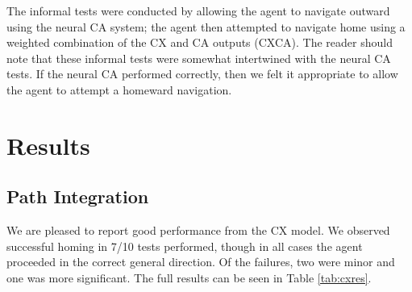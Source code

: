\documentclass[a4paper,11pt,twoside,openright]{article}
\let\oldsection\section
\def\section{\cleardoublepage\oldsection}
\begin{document}
The informal tests were conducted by allowing the agent to navigate
outward using the neural CA system; the agent then attempted to
navigate home using a weighted combination of the CX and CA outputs
(CXCA). The reader should note that these informal tests were somewhat
intertwined with the neural CA tests. If the neural CA performed
correctly, then we felt it appropriate to allow the agent to attempt a
homeward navigation.
\newpage

\section{ Results } \label{sec:results}
\subsection{ Path Integration }
We are pleased to report good performance from the CX model. We
observed successful homing in 7/10 tests performed, though in all
cases the agent proceeded in the correct general direction. Of the
failures, two were minor and one was more significant. The full
results can be seen in Table \ref{tab:cxres}.
\newline
\par
\end{document}
